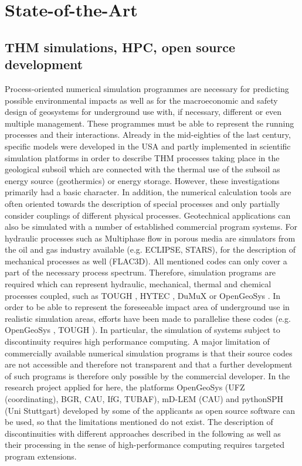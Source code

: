 \section{State-of-the-Art} 

\subsection{THM simulations, HPC, open source development}

Process-oriented numerical simulation programmes are necessary for predicting possible environmental impacts as well as for the macroeconomic and safety design of geosystems for underground use with, if necessary, different or even multiple management. These programmes must be able to represent the running processes and their interactions. Already in the mid-eighties of the last century, specific models were developed in the USA and partly implemented in scientific simulation platforms in order to describe THM processes taking place in the geological subsoil which are connected with the thermal use of the subsoil as energy source (geothermics) or energy storage. However, these investigations primarily had a basic character. In addition, the numerical calculation tools are often oriented towards the description of special processes and only partially consider couplings of different physical processes. Geotechnical applications can also be simulated with a number of established commercial program systems. For hydraulic processes such as Multiphase flow in porous media are simulators from the oil and gas industry available (e.g. ECLIPSE, STARS), for the description of mechanical processes as well (FLAC3D). All mentioned codes can only cover a part of the necessary process spectrum. Therefore, simulation programs are required which can represent hydraulic, mechanical, thermal and chemical processes coupled, such as TOUGH \cite{Pruess2004738}, HYTEC \cite{vanderLee2002599}, DuMuX \cite{Flemisch20111102} or OpenGeoSys \cite{Kolditz2012613}. In order to be able to represent the foreseeable impact area of underground use in realistic simulation areas, efforts have been made to parallelise these codes (e.g. OpenGeoSys \cite{Wang20152269}, TOUGH \cite{Wu2002243}). In particular, the simulation of systems subject to discontinuity requires high performance computing. A major limitation of commercially available numerical simulation programs is that their source codes are not accessible and therefore not transparent and that a further development of such programs is therefore only possible by the commercial developer. In the research project applied for here, the platforms OpenGeoSys (UFZ (coordinating), BGR, CAU, IfG, TUBAF), mD-LEM (CAU) and pythonSPH (Uni Stuttgart) developed by some of the applicants as open source software can be used, so that the limitations mentioned do not exist. The description of discontinuities with different approaches described in the following as well as their processing in the sense of high-performance computing requires targeted program extensions.

